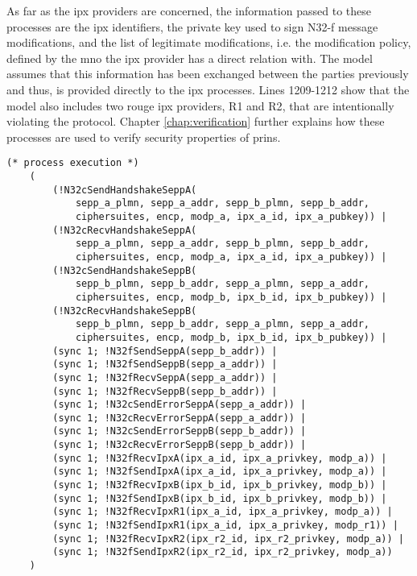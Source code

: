 As far as the \gls{ipx} providers are concerned, the information passed to these processes are the \gls{ipx} identifiers, the private key used to sign N32-f message modifications, and the list of legitimate modifications, i.e. the modification policy, defined by the \gls{mno} the \gls{ipx} provider has a direct relation with.
The model assumes that this information has been exchanged between the parties previously and thus, is provided directly to the \gls{ipx} processes.
Lines 1209-1212 show that the model also includes two rouge \gls{ipx} providers, {\sffamily R1} and {\sffamily R2}, that are intentionally violating the protocol.
Chapter \ref{chap:verification} further explains how these processes are used to verify security properties of \gls{prins}.

\begin{lstlisting}[caption={Definition of the main process},label={lst:main-proc},firstnumber=1183]
    (* process execution *)
    (
        (!N32cSendHandshakeSeppA(
            sepp_a_plmn, sepp_a_addr, sepp_b_plmn, sepp_b_addr,
            ciphersuites, encp, modp_a, ipx_a_id, ipx_a_pubkey)) |
        (!N32cRecvHandshakeSeppA(
            sepp_a_plmn, sepp_a_addr, sepp_b_plmn, sepp_b_addr,
            ciphersuites, encp, modp_a, ipx_a_id, ipx_a_pubkey)) |
        (!N32cSendHandshakeSeppB(
            sepp_b_plmn, sepp_b_addr, sepp_a_plmn, sepp_a_addr,
            ciphersuites, encp, modp_b, ipx_b_id, ipx_b_pubkey)) |
        (!N32cRecvHandshakeSeppB(
            sepp_b_plmn, sepp_b_addr, sepp_a_plmn, sepp_a_addr,
            ciphersuites, encp, modp_b, ipx_b_id, ipx_b_pubkey)) |
        (sync 1; !N32fSendSeppA(sepp_b_addr)) |
        (sync 1; !N32fSendSeppB(sepp_a_addr)) |
        (sync 1; !N32fRecvSeppA(sepp_a_addr)) |
        (sync 1; !N32fRecvSeppB(sepp_b_addr)) |
        (sync 1; !N32cSendErrorSeppA(sepp_a_addr)) |
        (sync 1; !N32cRecvErrorSeppA(sepp_a_addr)) |
        (sync 1; !N32cSendErrorSeppB(sepp_b_addr)) |
        (sync 1; !N32cRecvErrorSeppB(sepp_b_addr)) |
        (sync 1; !N32fRecvIpxA(ipx_a_id, ipx_a_privkey, modp_a)) |
        (sync 1; !N32fSendIpxA(ipx_a_id, ipx_a_privkey, modp_a)) |
        (sync 1; !N32fRecvIpxB(ipx_b_id, ipx_b_privkey, modp_b)) |
        (sync 1; !N32fSendIpxB(ipx_b_id, ipx_b_privkey, modp_b)) |
        (sync 1; !N32fRecvIpxR1(ipx_a_id, ipx_a_privkey, modp_a)) |
        (sync 1; !N32fSendIpxR1(ipx_a_id, ipx_a_privkey, modp_r1)) |
        (sync 1; !N32fRecvIpxR2(ipx_r2_id, ipx_r2_privkey, modp_a)) |
        (sync 1; !N32fSendIpxR2(ipx_r2_id, ipx_r2_privkey, modp_a))
    )
\end{lstlisting}